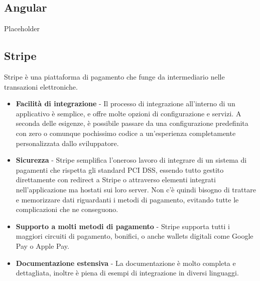 \subsection{Angular}
Placeholder
\subsection{Stripe}
Stripe \`e una piattaforma di pagamento che funge da intermediario nelle transazioni elettroniche.

\begin{itemize}
  \item \textbf{Facilit\`a di integrazione} - Il processo di integrazione all'interno di un applicativo \`e semplice, e offre molte opzioni di configurazione e servizi.
    A seconda delle esigenze, \`e possibile passare da una configurazione predefinita con zero o comunque pochissimo codice a un'esperienza completamente personalizzata dallo sviluppatore.
  \item \textbf{Sicurezza} - Stripe semplifica l'oneroso lavoro di integrare di un sistema di pagamenti che rispetta gli standard PCI DSS, essendo tutto gestito
    direttamente con redirect a Stripe o attraverso elementi integrati nell'applicazione ma hostati sui loro server. Non c'\`e quindi bisogno di trattare e memorizzare dati
    riguardanti i metodi di pagamento, evitando tutte le complicazioni che ne conseguono.
  \item \textbf{Supporto a molti metodi di pagamento} - Stripe supporta tutti i maggiori circuiti di pagamento, bonifici, o anche wallets digitali come Google Pay o Apple Pay.
  \item \textbf{Documentazione estensiva} - La documentazione \`e molto completa e dettagliata, inoltre \`e piena di esempi di integrazione in diversi linguaggi.
\end{itemize}

